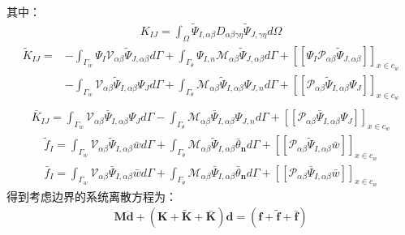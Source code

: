 其中：
\begin{equation}
\begin{split}
    K_{IJ}=\int_{\Omega}\tilde{\Psi}_{I,\alpha\beta}D_{\alpha\beta\gamma\eta}\tilde{\Psi}_{J,\gamma\eta}d\Omega 
\end{split}
\end{equation}
\begin{equation}
\begin{split}
    \tilde{K}_{IJ}=&-\int_{\Gamma_w}\Psi_I\mathcal{V}_{\alpha\beta}\tilde{\Psi}_{J,\alpha\beta}d\Gamma+\int_{\Gamma_{\theta}}\Psi_{I,n}\mathcal{M}_{\alpha\beta}\tilde{\Psi}_{J,\alpha\beta}d\Gamma+[[\Psi_I\mathcal{P}_{\alpha\beta}\tilde{\Psi}_{J,\alpha\beta}]]_{x\in{c_w}}\\
    &-\int_{\Gamma_w}\mathcal{V}_{\alpha\beta}\tilde{\Psi}_{I,\alpha\beta}\Psi_Jd\Gamma+\int_{\Gamma_{\theta}}\mathcal{M}_{\alpha\beta}\tilde{\Psi}_{I,\alpha\beta}\Psi_{J,n}d\Gamma+[[\mathcal{P}_{\alpha\beta}\tilde{\Psi}_{I,\alpha\beta}\Psi_J]]_{x\in{c_w}}\\
\end{split}
\end{equation}
\begin{equation}
\begin{split}
    \bar{K}_{IJ}=\int_{\Gamma_w}\mathcal{V}_{\alpha\beta}\bar{\Psi}_{I,\alpha\beta}\Psi_Jd\Gamma-\int_{\Gamma_{\theta}}\mathcal{M}_{\alpha\beta}\bar{\Psi}_{I,\alpha\beta}\Psi_{J,n}d\Gamma+[[\mathcal{P}_{\alpha\beta}\bar{\Psi}_{I,\alpha\beta}\Psi_J]]_{x\in{c_w}}
\end{split}
\end{equation}
\begin{equation}
\begin{split}
    \tilde{f}_I=\int_{\Gamma_w}\mathcal{V}_{\alpha\beta}\tilde{\Psi}_{I,\alpha\beta}\bar{w}d\Gamma+\int_{\Gamma_{\theta}}\mathcal{M}_{\alpha\beta}\tilde{\Psi}_{I,\alpha\beta}\bar{\theta}_{\pmb n}d\Gamma+[[\mathcal{P}_{\alpha\beta}\tilde{\Psi}_{I,\alpha\beta}\bar{w}]]_{x\in{c_w}}
\end{split}
\end{equation}
\begin{equation}
\begin{split}
        \bar{f}_I=\int_{\Gamma_w}\mathcal{V}_{\alpha\beta}\bar{\Psi}_{I,\alpha\beta}\bar{w}d\Gamma+\int_{\Gamma_{\theta}}\mathcal{M}_{\alpha\beta}\bar{\Psi}_{I,\alpha\beta}\bar{\theta}_{\pmb n}d\Gamma+[[\mathcal{P}_{\alpha\beta}\bar{\Psi}_{I,\alpha\beta}\bar{w}]]_{x\in{c_w}}
\end{split}
\end{equation}
得到考虑边界的系统离散方程为：
\begin{equation}
\begin{split}
    \pmb{M}\ddot{\pmb{d}}+(\pmb{K}+\tilde{\pmb{K}}+\bar{\pmb{K}})\pmb{d}=(\pmb{f}+\tilde{\pmb{f}}+\bar{\pmb{f}})
\end{split}
\end{equation}
